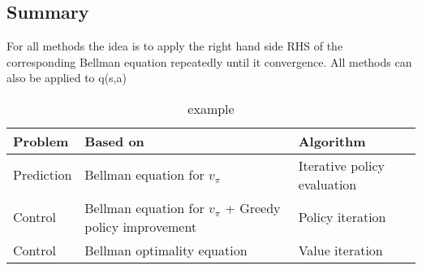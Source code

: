 \subsection*{Summary}
For all methods the idea is to apply the right hand side RHS of the corresponding Bellman equation repeatedly until it convergence. All methods can also be applied to q(s,a) 

\begin{table}[ht!]
\centering
\begin{tabular}{lll}
 \textbf{Problem}& \textbf{Based on}  &\textbf{Algorithm}  \\ \hline
 Prediction& Bellman equation for $v_\pi$  &Iterative policy evaluation  \\
 Control& Bellman equation for $v_\pi$ + Greedy policy improvement  & Policy iteration \\ 
 Control& Bellman optimality equation& Value iteration \\ \hline
\end{tabular}
\caption{example}
\label{tab:tab1}
\end{table}



